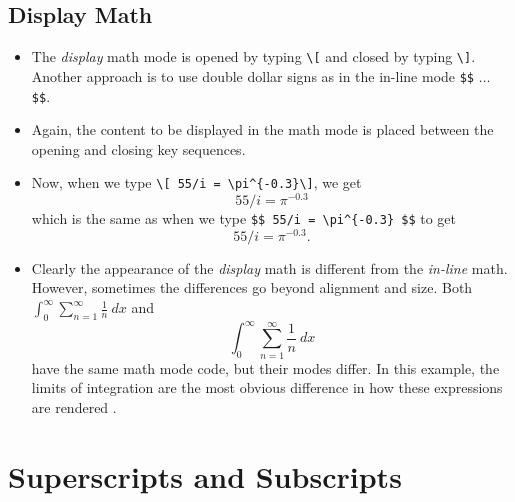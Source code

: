 \subsection*{Display Math}

\begin{itemize}

\item The \textit{display} math mode is opened by typing \verb=\[= and closed by
  typing \verb=\]=. Another approach is to use double dollar signs as in the
  in-line mode \verb=$$= $\ldots$ \verb=$$=.

\item Again, the content to be displayed in the math mode is placed between the
  opening and closing key sequences.

\item Now, when we type \verb!\[ 55/i = \pi^{-0.3}\]!, we get
  \[55/i = \pi^{-0.3} \] which is the same as when we type
  \verb!$$ 55/i = \pi^{-0.3} $$! to get
  $$
  55/i = \pi^{-0.3}.
  $$

\item Clearly the appearance of the \textit{display} math is different from the
  \textit{in-line} math. However, sometimes the differences go beyond alignment
  and size. Both $\int_{0}^{\infty} \sum_{n=1}^{\infty} \frac{1}{n}~dx$ and
\[
\int_{0}^{\infty} \sum_{n=1}^{\infty} \frac{1}{n}~dx
\]
have the same math mode code, but their modes differ. In this example, the
limits of integration are the most obvious difference in how these expressions
are rendered
.
\end{itemize}

\section{Superscripts and Subscripts}

